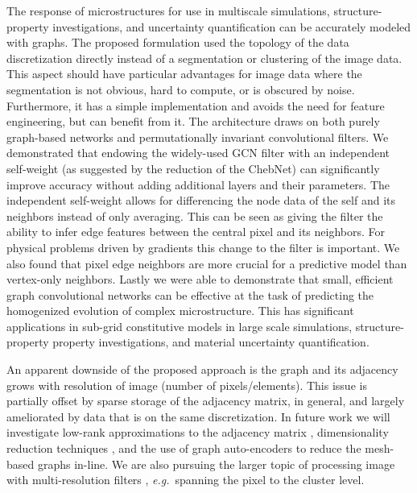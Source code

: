 \documentclass[12pt,reqno]{article}
\newcommand{\eg}{{\it e.g.}\!\, }
\begin{document}
The response of microstructures for use in multiscale simulations, structure-property investigations, and uncertainty quantification can be accurately modeled with graphs.
The proposed formulation used the topology of the data discretization directly instead of a segmentation or clustering of the image data.
This aspect should have particular advantages for image data where the segmentation is not obvious, hard to compute, or is obscured by noise.
Furthermore, it has a simple implementation and avoids the need for feature engineering, but can benefit from it.
The architecture draws on both purely graph-based networks and permutationally invariant convolutional filters.
We demonstrated that endowing the widely-used GCN filter \cite{kipf2016semi} with an independent self-weight (as suggested by the reduction of the ChebNet) can significantly improve accuracy without adding additional layers and their parameters.
The independent self-weight allows for differencing the node data of the self and its neighbors instead of only averaging.
This can be seen as giving the filter the ability to infer edge features between the central pixel and its neighbors.
For physical problems driven by gradients this change to the filter is important.
We also found that pixel edge neighbors are more crucial for a predictive model than vertex-only neighbors.
Lastly we were able to demonstrate that small, efficient graph convolutional networks can be effective at the task of predicting the homogenized evolution of complex microstructure.
This has significant applications in sub-grid constitutive models in large scale simulations, structure-property property investigations, and material uncertainty quantification.

An apparent downside of the proposed approach is the graph and its adjacency grows with resolution of image (number of pixels/elements).
This issue is partially offset by sparse storage of the adjacency matrix, in general, and largely ameliorated by data that is on the same discretization.
In future work we will investigate low-rank approximations to the adjacency matrix \cite{savas2011clustered,richard2012estimation,lebedev2014speeding,tai2015convolutional,kanada2018low}, dimensionality reduction techniques \cite{belkin2003laplacian,he2004locality}, and the use of graph auto-encoders \cite{kipf2016variational,liao2016graph,hasanzadeh2019semi,salehi2019graph} to reduce the mesh-based graphs in-line.
We are also pursuing the larger topic of processing image with multi-resolution filters \cite{zhang2018multiresolution}, \eg spanning the pixel to the cluster level.
\end{document}
